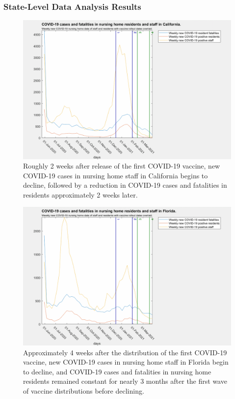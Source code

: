 \documentclass[twoside]{article}
\begin{document}
\begin{multicols}{2}
\subsubsection{State-Level Data Analysis Results}

\begin{figure}[H]
	\includegraphics[width=\linewidth]{images/california_nursing_home_with_vaccine.png}
	\caption{Roughly 2 weeks after release of the first COVID-19 vaccine, new COVID-19 cases in nursing home staff in California begins to decline, followed by a reduction in COVID-19 cases and fatalities in residents approximately 2 weeks later. }
	\label{fig:images/california_nursing_home_with_vaccineLabel}
\end{figure}

\begin{figure}[H]
	\includegraphics[width=\linewidth]{images/florida_nursing_home_with_vaccine.png}
	\caption{Approximately 4 weeks after the distribution of the first COVID-19 vaccine, new COVID-19 cases in nursing home staff in Florida begin to decline, and COVID-19 cases and fatalities in nursing home residents remained constant for nearly 3 months after the first wave of vaccine distributions before declining.}
	\label{fig:images/florida_nursing_home_with_vaccineLabel}
\end{figure}


\end{multicols}
\end{document}
